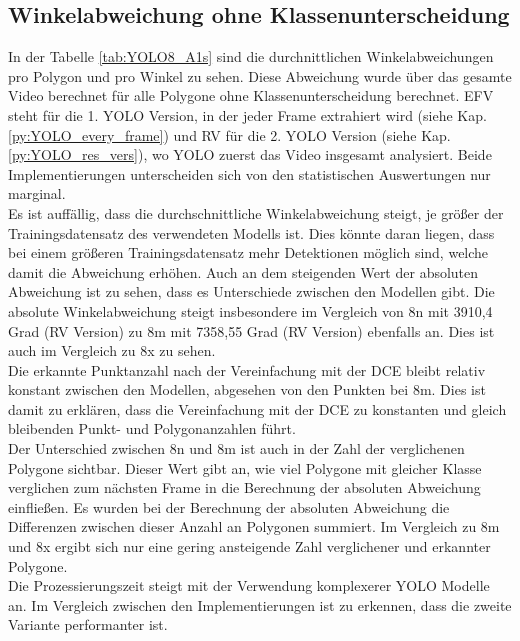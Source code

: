 \subsection{Winkelabweichung ohne Klassenunterscheidung}
{	
	In der Tabelle \ref{tab:YOLO8_A1s} sind die durchnittlichen Winkelabweichungen pro Polygon und pro Winkel zu sehen. Diese Abweichung wurde über das gesamte Video berechnet für alle Polygone ohne Klassenunterscheidung berechnet.  EFV steht für die 1. YOLO Version, in der jeder Frame extrahiert wird (siehe Kap. \ref{py:YOLO_every_frame}) und RV für die 2. YOLO Version (siehe Kap. \ref{py:YOLO_res_vers}), wo YOLO zuerst das Video insgesamt analysiert. Beide Implementierungen unterscheiden sich von den statistischen Auswertungen nur marginal.\\
	Es ist auffällig, dass die durchschnittliche  Winkelabweichung steigt, je größer der Trainingsdatensatz des verwendeten Modells ist. Dies könnte daran liegen, dass bei einem größeren Trainingsdatensatz mehr Detektionen möglich sind, welche damit  die Abweichung erhöhen. Auch an dem steigenden Wert der absoluten Abweichung ist zu sehen, dass es Unterschiede zwischen den Modellen gibt. Die absolute Winkelabweichung steigt insbesondere im Vergleich von 8n mit 3910,4 Grad (RV Version) zu 8m mit 7358,55 Grad (RV Version) ebenfalls an. Dies ist auch im Vergleich zu 8x zu sehen. \\
	Die erkannte Punktanzahl nach der Vereinfachung mit der DCE bleibt relativ konstant zwischen den Modellen, abgesehen von den Punkten bei 8m. Dies ist damit zu erklären, dass die Vereinfachung mit der DCE zu konstanten und gleich bleibenden Punkt- und Polygonanzahlen führt. \\
	Der Unterschied zwischen 8n und 8m ist auch in der Zahl der verglichenen Polygone sichtbar. Dieser Wert gibt an, wie viel Polygone mit gleicher Klasse verglichen zum nächsten Frame in die Berechnung der absoluten Abweichung einfließen. Es wurden bei der Berechnung der absoluten Abweichung die Differenzen zwischen dieser Anzahl an Polygonen summiert. Im Vergleich zu 8m und 8x ergibt sich nur eine gering ansteigende Zahl verglichener und erkannter Polygone. \\
	Die Prozessierungszeit steigt mit der Verwendung komplexerer YOLO Modelle an. Im Vergleich zwischen den Implementierungen ist zu erkennen, dass die zweite Variante performanter ist.
	\begin{table}[h]

\end{table}}
